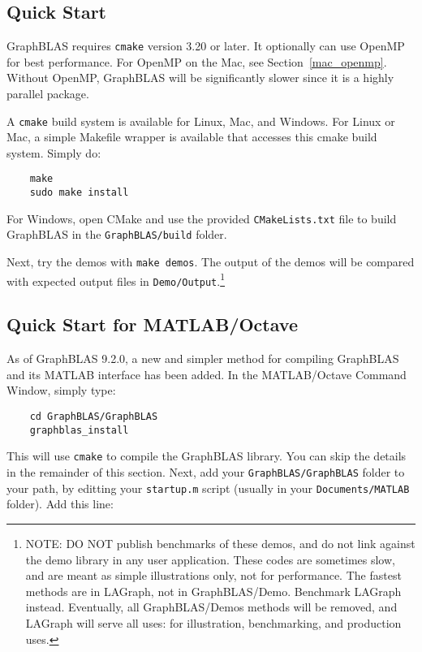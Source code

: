 \documentclass[12pt]{article}
\begin{document}
\subsection{Quick Start}

GraphBLAS requires \verb'cmake' version 3.20 or later.
It optionally can use OpenMP for best performance.
For OpenMP on the Mac, see Section~\ref{mac_openmp}.
Without OpenMP, GraphBLAS will be significantly slower since it is a highly
parallel package.

A \verb'cmake' build system is available for Linux, Mac, and Windows.
For Linux or Mac, a simple Makefile wrapper is available that accesses this
cmake build system.  Simply do:

    {\small
    \begin{verbatim}
    make
    sudo make install \end{verbatim} }

For Windows, open CMake and use the provided \verb'CMakeLists.txt' file
to build GraphBLAS in the \verb'GraphBLAS/build' folder.

Next, try the demos with \verb'make demos'.
The output of the demos will be compared with expected
output files in \verb'Demo/Output'.\footnote{
NOTE:
DO NOT publish benchmarks of these demos, and do not link against the
demo library in any user application.  These codes are sometimes slow,
and are meant as simple illustrations only, not for performance.  The fastest
methods are in LAGraph, not in GraphBLAS/Demo.  Benchmark LAGraph
instead.  Eventually, all GraphBLAS/Demos methods will be removed, and LAGraph
will serve all uses: for illustration, benchmarking, and production uses.}

\subsection{Quick Start for MATLAB/Octave}

As of GraphBLAS 9.2.0, a new and simpler method for compiling GraphBLAS and its
MATLAB interface has been added.  In the MATLAB/Octave Command Window, simply
type:

    {\small
    \begin{verbatim}
    cd GraphBLAS/GraphBLAS
    graphblas_install \end{verbatim} }

This will use \verb'cmake' to compile the GraphBLAS library.  You can skip the
details in the remainder of this section.  Next, add your
\verb'GraphBLAS/GraphBLAS' folder to your path, by editting your
\verb'startup.m' script (usually in your \verb'Documents/MATLAB' folder).
Add this line:
\end{document}
